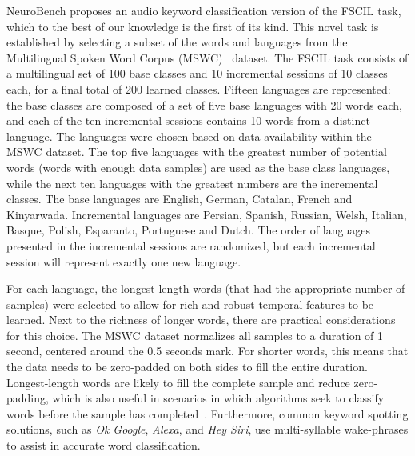 NeuroBench proposes an audio keyword classification version of the FSCIL task, which to the best of our knowledge is the first of its kind. This novel task is established by selecting a subset of the words and languages from the Multilingual Spoken Word Corpus (MSWC)~\cite{mazumder21mswc} dataset. The FSCIL task consists of a multilingual set of 100 base classes and 10 incremental sessions of 10 classes each, for a final total of 200 learned classes. 
Fifteen languages are represented: the base classes are composed of a set of five base languages with 20 words each, and each of the ten incremental sessions contains 10 words from a distinct language. The languages were chosen based on data availability within the MSWC dataset. The top five languages with the greatest number of potential words (words with enough data samples) are used as the base class languages, while the next ten languages with the greatest numbers are the incremental classes. 
The base languages are English, German, Catalan, French and Kinyarwada. Incremental languages are Persian, Spanish, Russian, Welsh, Italian, Basque, Polish, Esparanto, Portuguese and Dutch. The order of languages presented in the incremental sessions are randomized, but each incremental session will represent exactly one new language.

For each language, the longest length words (that had the appropriate number of samples) were selected to allow for rich and robust temporal features to be learned. Next to the richness of longer words, there are practical considerations for this choice. The MSWC dataset normalizes all samples to a duration of 1 second, centered around the 0.5 seconds mark. For shorter words, this means that the data needs to be zero-padded on both sides to fill the entire duration. Longest-length words are likely to fill the complete sample and reduce zero-padding, which is also useful in scenarios in which algorithms seek to classify words before the sample has completed~\cite{jeffares2022spikeinspired}. Furthermore, common keyword spotting solutions, such as \textit{Ok Google}, \textit{Alexa}, and \textit{Hey Siri}, use multi-syllable wake-phrases to assist in accurate word classification. 

